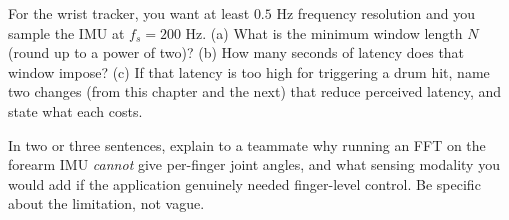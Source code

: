\begin{exercise}
\label{ch09:ex-wrist}
For the wrist tracker, you want at least $0.5$ Hz frequency resolution and you sample the
IMU at $f_s = 200$ Hz. (a) What is the minimum window length $N$ (round up to a power of
two)? (b) How many seconds of latency does that window impose? (c) If that latency is too
high for triggering a drum hit, name two changes (from this chapter and the next) that
reduce perceived latency, and state what each costs.
\end{exercise}

\begin{exercise}
\label{ch09:ex-limits}
In two or three sentences, explain to a teammate why running an FFT on the forearm IMU
\emph{cannot} give per-finger joint angles, and what sensing modality you would add if
the application genuinely needed finger-level control. Be specific about the limitation,
not vague.
\end{exercise}
